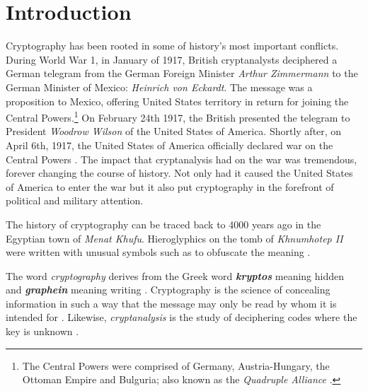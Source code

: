 \chapter{Introduction} %
\label{Introduction} %




Cryptography has been rooted in some of history's most important conflicts. 
During World War 1, in January of 1917, British cryptanalysts deciphered a German
telegram from the German Foreign Minister \textit{Arthur Zimmermann} to the German Minister
of Mexico: \textit{Heinrich von Eckardt}. The message was a proposition to Mexico, offering
United States territory in return for joining the Central Powers.\footnote{The Central Powers 
were comprised of Germany, Austria-Hungary, the Ottoman Empire and Bulguria; also known as
the \textit{Quadruple Alliance} \cite{wiki:central_powers}.} On February 24th 1917, the British
presented the telegram to President \textit{Woodrow Wilson} of the United States of America. 
Shortly after, on April 6th, 1917, the United States of America officially declared war
on the Central Powers \cite{the_zimmermann_telegram}. The impact that cryptanalysis had on
the war was tremendous, forever changing the course of history. Not only had it caused the
United States of America to enter the war but it also put cryptography in the forefront of political
and military attention. 

The history of cryptography can be traced back to 4000 years ago in the Egyptian town of 
\textit{Menat Khufu}. Hieroglyphics on the tomb of \textit{Khnumhotep II} were written with unusual 
symbols such as to obfuscate the meaning \cite{history_of_cryptography}. 

The word \textit{cryptography} derives from the Greek word \textbf{\textit{kryptos}}
meaning hidden and \textbf{\textit{graphein}} meaning writing \cite{pawlan_cryptography}.
Cryptography is the science of concealing information in such a way that the message
may only be read by whom it is intended for \cite{cryptography_definition}. 
Likewise, \textit{cryptanalysis} is the study of deciphering codes where the key is unknown 
\cite{cryptanalysis_definition}.  

